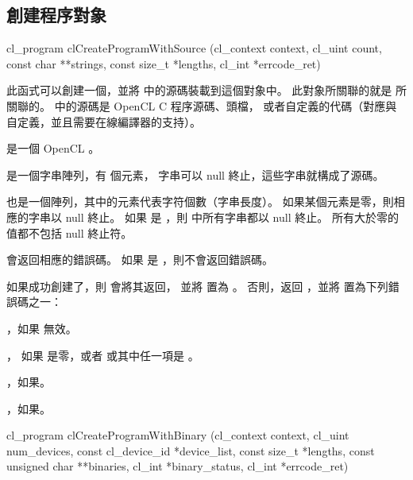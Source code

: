 \subsection{創建程序對象}


\startCLFUNC
cl_program clCreateProgramWithSource (cl_context context,
			cl_uint count,
			const char **strings,
			const size_t *lengths,
			cl_int *errcode_ret)
\stopCLFUNC

此函式可以創建一個，並將  中的源碼裝載到這個對象中。
此對象所關聯的就是  所關聯的。
 中的源碼是 OpenCL C 程序源碼、頭檔，
或者自定義的代碼（對應與自定義，並且需要在線編譯器的支持）。

 是一個 OpenCL 。

 是一個字串陣列，有  個元素，
字串可以 null 終止，這些字串就構成了源碼。

 也是一個陣列，其中的元素代表字符個數（字串長度）。
如果某個元素是零，則相應的字串以 null 終止。
如果  是 ，則  中所有字串都以 null 終止。
所有大於零的值都不包括 null 終止符。

 會返回相應的錯誤碼。
如果  是 ，則不會返回錯誤碼。

如果成功創建了，則  會將其返回，
並將  置為 。
否則，返回 ，並將  置為下列錯誤碼之一：
\startigBase
\item {}，如果  無效。

\item {}，
如果  是零，或者  或其中任一項是 。

\item {}，如果\scdevfailres。

\item {}，如果\schostfailres。
\stopigBase


\startCLFUNC
cl_program clCreateProgramWithBinary (cl_context context,
			cl_uint num_devices,
			const cl_device_id *device_list,
			const size_t *lengths,
			const unsigned char **binaries,
			cl_int *binary_status,
			cl_int *errcode_ret)
\stopCLFUNC

